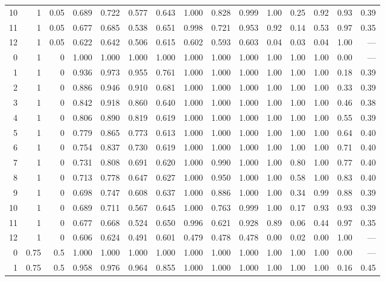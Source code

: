 \begin{landscape}
\begin{longtable}{rrrrrrrrrrrrrrr}
10 & 1 & 0.05 & 0.689 & 0.722 & 0.577 & 0.643 & 1.000 & 0.828 & 0.999 & 1.00 & 0.25 & 0.92 & 0.93 & 0.39 \\
11 & 1 & 0.05 & 0.677 & 0.685 & 0.538 & 0.651 & 0.998 & 0.721 & 0.953 & 0.92 & 0.14 & 0.53 & 0.97 & 0.35 \\
12 & 1 & 0.05 & 0.622 & 0.642 & 0.506 & 0.615 & 0.602 & 0.593 & 0.603 & 0.04 & 0.03 & 0.04 & 1.00 & --- \\
\midrule
0 & 1 & 0 & 1.000 & 1.000 & 1.000 & 1.000 & 1.000 & 1.000 & 1.000 & 1.00 & 1.00 & 1.00 & 0.00 & --- \\
1 & 1 & 0 & 0.936 & 0.973 & 0.955 & 0.761 & 1.000 & 1.000 & 1.000 & 1.00 & 1.00 & 1.00 & 0.18 & 0.39 \\
2 & 1 & 0 & 0.886 & 0.946 & 0.910 & 0.681 & 1.000 & 1.000 & 1.000 & 1.00 & 1.00 & 1.00 & 0.33 & 0.39 \\
3 & 1 & 0 & 0.842 & 0.918 & 0.860 & 0.640 & 1.000 & 1.000 & 1.000 & 1.00 & 1.00 & 1.00 & 0.46 & 0.38 \\
4 & 1 & 0 & 0.806 & 0.890 & 0.819 & 0.619 & 1.000 & 1.000 & 1.000 & 1.00 & 1.00 & 1.00 & 0.55 & 0.39 \\
5 & 1 & 0 & 0.779 & 0.865 & 0.773 & 0.613 & 1.000 & 1.000 & 1.000 & 1.00 & 1.00 & 1.00 & 0.64 & 0.40 \\
6 & 1 & 0 & 0.754 & 0.837 & 0.730 & 0.619 & 1.000 & 1.000 & 1.000 & 1.00 & 1.00 & 1.00 & 0.71 & 0.40 \\
7 & 1 & 0 & 0.731 & 0.808 & 0.691 & 0.620 & 1.000 & 0.990 & 1.000 & 1.00 & 0.80 & 1.00 & 0.77 & 0.40 \\
8 & 1 & 0 & 0.713 & 0.778 & 0.647 & 0.627 & 1.000 & 0.950 & 1.000 & 1.00 & 0.58 & 1.00 & 0.83 & 0.40 \\
9 & 1 & 0 & 0.698 & 0.747 & 0.608 & 0.637 & 1.000 & 0.886 & 1.000 & 1.00 & 0.34 & 0.99 & 0.88 & 0.39 \\
10 & 1 & 0 & 0.689 & 0.711 & 0.567 & 0.645 & 1.000 & 0.763 & 0.999 & 1.00 & 0.17 & 0.93 & 0.93 & 0.39 \\
11 & 1 & 0 & 0.677 & 0.668 & 0.524 & 0.650 & 0.996 & 0.621 & 0.928 & 0.89 & 0.06 & 0.44 & 0.97 & 0.35 \\
12 & 1 & 0 & 0.606 & 0.624 & 0.491 & 0.601 & 0.479 & 0.478 & 0.478 & 0.00 & 0.02 & 0.00 & 1.00 & --- \\
\midrule
0 & 0.75 & 0.5 & 1.000 & 1.000 & 1.000 & 1.000 & 1.000 & 1.000 & 1.000 & 1.00 & 1.00 & 1.00 & 0.00 & --- \\
1 & 0.75 & 0.5 & 0.958 & 0.976 & 0.964 & 0.855 & 1.000 & 1.000 & 1.000 & 1.00 & 1.00 & 1.00 & 0.16 & 0.45 \\

\end{longtable}
\end{landscape}

